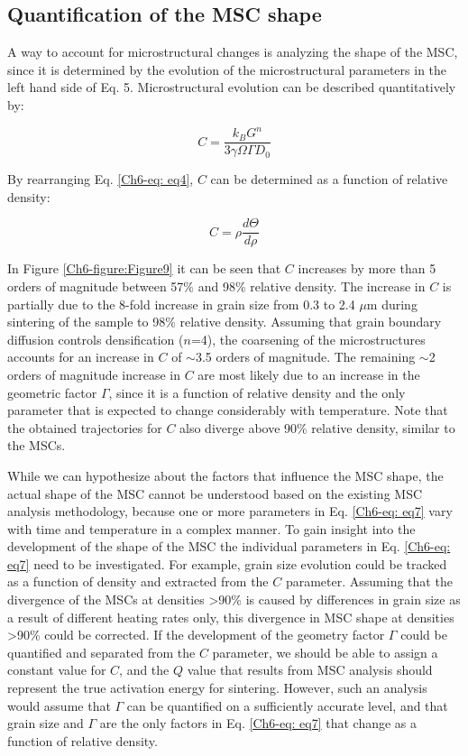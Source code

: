 \subsection{Quantification of the MSC shape}
A way to account for microstructural changes is analyzing the shape of the MSC, since it is determined by the evolution of the microstructural parameters in the left hand side of Eq. 5. Microstructural evolution can be described quantitatively by:

\begin{equation}
\label{Ch6-eq: eq7}
C = \frac{k_{B} G^{n}}{3 \gamma \Omega \Gamma D_{0}}
\end{equation}

\noindent By rearranging Eq. \ref{Ch6-eq: eq4}, $C$ can be determined as a function of relative density:

\begin{equation}
\label{Ch6-eq: eq8}
C = \rho \frac{d \Theta}{d \rho}
\end{equation}

\noindent In Figure \ref{Ch6-figure:Figure9} it can be seen that $C$ increases by more than 5 orders of magnitude between 57\% and 98\% relative density. The increase in $C$ is partially due to the 8-fold increase in grain size from 0.3 to 2.4 $\mu$m during sintering of the sample to 98\% relative density. Assuming that grain boundary diffusion controls densification ($n$=4), the coarsening of the microstructures accounts for an increase in $C$ of $\sim$3.5 orders of magnitude. The remaining $\sim$2 orders of magnitude increase in $C$ are most likely due to an increase in the geometric factor $\Gamma$, since it is a function of relative density and the only parameter that is expected to change considerably with temperature. Note that the obtained trajectories for $C$ also diverge above 90\% relative density, similar to the MSCs.

While we can hypothesize about the factors that influence the MSC shape, the actual shape of the MSC cannot be understood based on the existing MSC analysis methodology, because one or more parameters in Eq. \ref{Ch6-eq: eq7} vary with time and temperature in a complex manner. To gain insight into the development of the shape of the MSC the individual parameters in Eq. \ref{Ch6-eq: eq7} need to be investigated. For example, grain size evolution could be tracked as a function of density and extracted from the $C$ parameter. Assuming that the divergence of the MSCs at densities >90\% is caused by differences in grain size as a result of different heating rates only, this divergence in MSC shape at densities >90\% could be corrected. If the development of the geometry factor $\Gamma$ could be quantified and separated from the $C$ parameter, we should be able to assign a constant value for $C$, and the $Q$ value that results from MSC analysis should represent the true activation energy for sintering. However, such an analysis would assume that $\Gamma$ can be quantified on a sufficiently accurate level, and that grain size and $\Gamma$ are the only factors in Eq. \ref{Ch6-eq: eq7} that change as a function of relative density.

